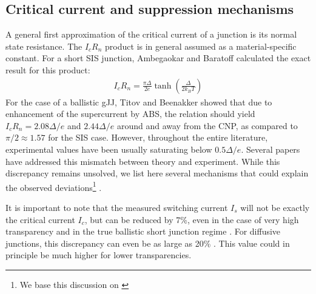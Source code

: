 \subsection{Critical current and suppression mechanisms}
A general first approximation of the critical current of a junction is its normal state resistance.
The $I_c R_n$ product is in general assumed as a material-specific constant\cite{tinkham_introduction_1996}.
For a short SIS junction, Ambegaokar and Baratoff calculated the exact result for this product:
\begin{eqnarray}
I_c R_n = \frac{\pi\Delta}{2e}\tanh\left(\frac{\Delta}{2k_BT}\right)
\end{eqnarray}
For the case of a ballistic gJJ, Titov and Beenakker\cite{titovJosephsonEffectBallistic2006b} showed that due to enhancement of the supercurrent by ABS, the relation should yield $I_cR_n=2.08\Delta/e$ and $2.44\Delta/e$ around and away from the CNP, as compared to $\pi/2\approx1.57$ for the SIS case.
However, throughout the entire literature, experimental values have been usually saturating below $0.5\Delta/e$.
Several papers have addressed this mismatch between theory and experiment.
While this discrepancy remains unsolved, we list here several mechanisms that could explain the observed deviations\footnote{We base this discussion on \cite{choiCompleteGateControl2013}} .

It is important to note that the measured switching current $I_s$ will not be exactly the critical current $I_c$, but can be reduced by 7\%, even in the case of very high transparency and in the true ballistic short junction regime \cite{leeUltimatelyShortBallistic2015}.
For diffusive junctions, this discrepancy can even be as large as 20\% \cite{keCriticalCurrentScaling2016}.
This value could in principle be much higher for lower transparencies.


